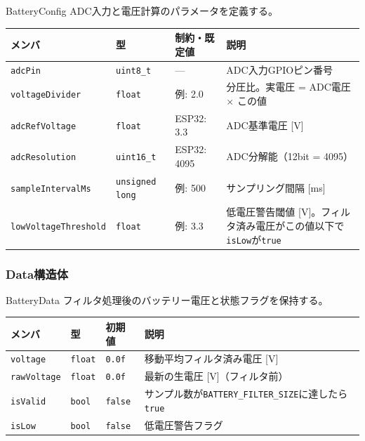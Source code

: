 \begin{funcblock}{BatteryConfig}
ADC入力と電圧計算のパラメータを定義する。

\begin{longtable}{l l l p{4.5cm}}
\toprule
\textbf{メンバ} & \textbf{型} & \textbf{制約・既定値} & \textbf{説明} \\
\midrule
\endhead
\texttt{adcPin}             & \texttt{uint8\_t}       & ---           & ADC入力GPIOピン番号 \\
\texttt{voltageDivider}     & \texttt{float}          & 例: 2.0       & 分圧比。実電圧 = ADC電圧 $\times$ この値 \\
\texttt{adcRefVoltage}      & \texttt{float}          & ESP32: 3.3    & ADC基準電圧 [V] \\
\texttt{adcResolution}      & \texttt{uint16\_t}      & ESP32: 4095   & ADC分解能（12bit = 4095） \\
\texttt{sampleIntervalMs}   & \texttt{unsigned long}  & 例: 500       & サンプリング間隔 [ms] \\
\texttt{lowVoltageThreshold} & \texttt{float}         & 例: 3.3       & 低電圧警告閾値 [V]。フィルタ済み電圧がこの値以下で\texttt{isLow}が\texttt{true} \\
\bottomrule
\end{longtable}
\end{funcblock}

\subsubsection{Data構造体}

\begin{funcblock}{BatteryData}
フィルタ処理後のバッテリー電圧と状態フラグを保持する。

\begin{longtable}{l l l p{4.8cm}}
\toprule
\textbf{メンバ} & \textbf{型} & \textbf{初期値} & \textbf{説明} \\
\midrule
\endhead
\texttt{voltage}    & \texttt{float} & \texttt{0.0f}  & 移動平均フィルタ済み電圧 [V] \\
\texttt{rawVoltage} & \texttt{float} & \texttt{0.0f}  & 最新の生電圧 [V]（フィルタ前） \\
\texttt{isValid}    & \texttt{bool}  & \texttt{false} & サンプル数が\texttt{BATTERY\_FILTER\_SIZE}に達したら\texttt{true} \\
\texttt{isLow}      & \texttt{bool}  & \texttt{false} & 低電圧警告フラグ \\
\bottomrule
\end{longtable}
\end{funcblock}

